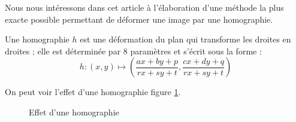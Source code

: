 



	Nous nous intéressons dans cet article à l'élaboration d'une méthode la plus exacte possible permettant de déformer une image par une homographie.
	
	\begin{Def}
 	Une homographie $h$ est une déformation du plan qui transforme les droites en droites ; elle est déterminée par 8 paramètres et s'écrit sous la forme :
	\[h : (x,y)\mapsto\left( \frac{ax+by+p}{rx+sy+t},\frac{cx+dy+q}{rx+sy+t}\right)\]
	\label{definition_homographie}
	\end{Def}
On peut voir l'effet d'une homographie figure \ref{effethom}.\\

 \begin{figure}
 
   \centering
    \arrowPDP 
   \caption{Effet d'une homographie}
\label{effethom}
 \end{figure}


